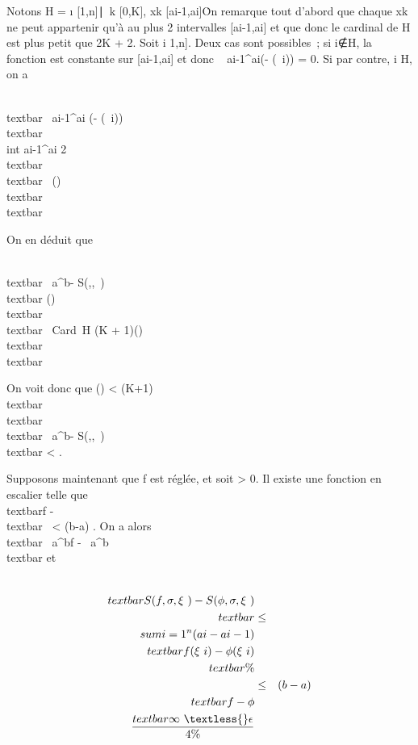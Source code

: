 Notons H = \i \in
{[}1,n{]}∣\exists~k \in
{[}0,K{]}, xk \in
{[}ai-1,ai{]}\. On remarque tout
d'abord que chaque xk ne peut appartenir qu'à au plus 2
intervalles {[}ai-1,ai{]} et que donc le cardinal de
H est plus petit que 2K + 2. Soit i \in {[}1,n{]}. Deux cas sont
possibles~; si i∉H, la fonction \phi est
constante sur {[}ai-1,ai{]} et donc
\int ~
ai-1^ai(\phi - \phi(\xi~i)) = 0. Si
par contre, i \in H, on a

\\textbar{}\int ~
ai-1^ai (\phi -
\phi(\xi~i))\\textbar{} \leq\\int
 ai-1^ai
2\\textbar{}\phi\\textbar{}\infty~ \delta(\sigma)\\textbar{}\phi\\textbar{}\infty~

On en déduit que

\\textbar{}\int ~
a^b\phi - S(\phi,\sigma,\xi~)\\textbar{} \delta(\sigma)\\textbar{}\phi\\textbar{}
\infty~Card~H (K +
1)\delta(\sigma)\\textbar{}\phi\\textbar{}\infty~

On voit donc que \delta(\sigma) \textless{} \epsilon {}(K+1)\\textbar{}\phi\\textbar{}\infty~
\rigtharrow~\\textbar{}\int ~
a^b\phi - S(\phi,\sigma,\xi~)\\textbar{} \textless{} \epsilon.

Supposons maintenant que f est réglée, et soit \epsilon \textgreater{} 0. Il
existe une fonction \phi en escalier telle que \\textbar{}f
- \phi\\textbar{}\infty~ \textless{} \epsilon {}(b-a) . On a alors
\\textbar{}\int ~
a^bf -\int ~
a^b\phi\\textbar{} \leq \epsilon {} et

\begin{align*} \\textbar{}S(f,\sigma,\xi~) -
S(\phi,\sigma,\xi~)\\textbar{}& \leq& \\sum
i=1^n(a i -
ai-1)\\textbar{}f(\xi~i) -
\phi(\xi~i)\\textbar{}\%&
\\ & \leq& (b -
a)\\textbar{}f - \phi\\textbar{}\infty~
\textless{} \epsilon \over 4 \%&
\\ \end{align*}

